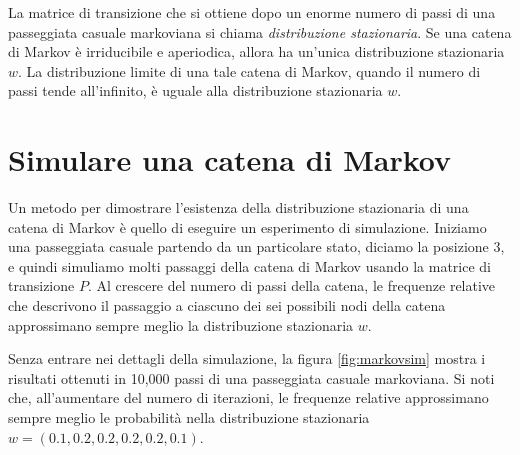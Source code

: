 \documentclass[
  10pt,
  italian,
  a4paper,
  extrafontsizes,onecolumn,openright
  ]{memoir}
\begin{document}
La matrice di transizione che si ottiene dopo un enorme numero di passi di una passeggiata casuale markoviana si chiama \emph{distribuzione stazionaria}. Se una catena di Markov è irriducibile e aperiodica, allora ha un'unica distribuzione stazionaria \(w\). La distribuzione limite di una tale catena di Markov, quando il numero di passi tende all'infinito, è uguale alla distribuzione stazionaria \(w\).

\hypertarget{simulare-una-catena-di-markov}{%
\section{Simulare una catena di Markov}\label{simulare-una-catena-di-markov}}

Un metodo per dimostrare l'esistenza della distribuzione stazionaria di una catena di Markov è quello di eseguire un esperimento di simulazione. Iniziamo una passeggiata casuale partendo da un particolare stato, diciamo la posizione 3, e quindi simuliamo molti passaggi della catena di Markov usando la matrice di transizione \(P\). Al crescere del numero di passi della catena, le frequenze relative che descrivono il passaggio a ciascuno dei sei possibili nodi della catena approssimano sempre meglio la distribuzione stazionaria \(w\).

Senza entrare nei dettagli della simulazione, la figura \ref{fig:markovsim} mostra i risultati ottenuti in 10,000 passi di una passeggiata casuale markoviana. Si noti che, all'aumentare del numero di iterazioni, le frequenze relative approssimano sempre meglio le probabilità nella distribuzione stazionaria \(w = (0.1, 0.2, 0.2, 0.2, 0.2, 0.1)\).
\end{document}

